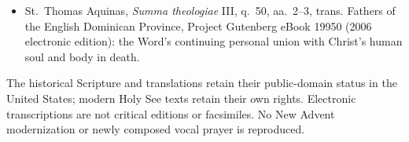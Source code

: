 \begin{itemize}[leftmargin=1.25em,itemsep=0.2em]
\item St.~Thomas Aquinas, \emph{Summa theologiae} III, q.~50, aa.~2--3, trans. Fathers of the English Dominican Province, Project Gutenberg eBook 19950 (2006 electronic edition): the Word's continuing personal union with Christ's human soul and body in death.
\end{itemize}
The historical Scripture and translations retain their public-domain status in the United States; modern Holy See texts retain their own rights. Electronic transcriptions are not critical editions or facsimiles. No New Advent modernization or newly composed vocal prayer is reproduced.
\endgroup
